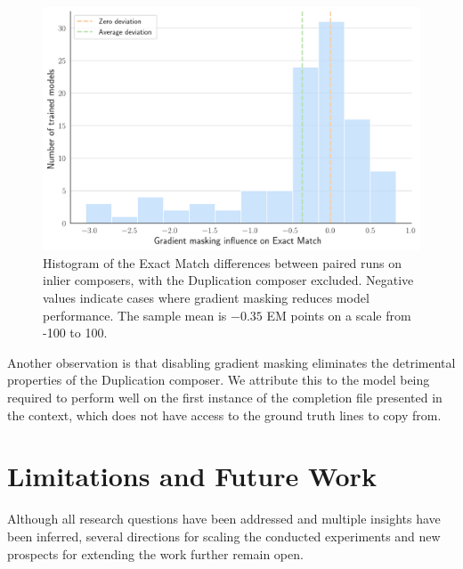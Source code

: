 \begin{figure}[ht]
    \centering
    \includegraphics[width=\textwidth]{figures/gradient-masking.pdf}
    \caption{Histogram of the Exact Match differences between paired runs on inlier composers, with the Duplication composer excluded. Negative values indicate cases where gradient masking reduces model performance. The sample mean is \(-0.35\) EM points on a scale from -100 to 100.}\label{fig:gradient-masking}
\end{figure}

Another observation is that disabling gradient masking eliminates the detrimental properties of the Duplication composer. We attribute this to the model being required to perform well on the first instance of the completion file presented in the context, which does not have access to the ground truth lines to copy from.


\section{Limitations and Future Work}

Although all research questions have been addressed and multiple insights have been inferred, several directions for scaling the conducted experiments and new prospects for extending the work further remain open.

